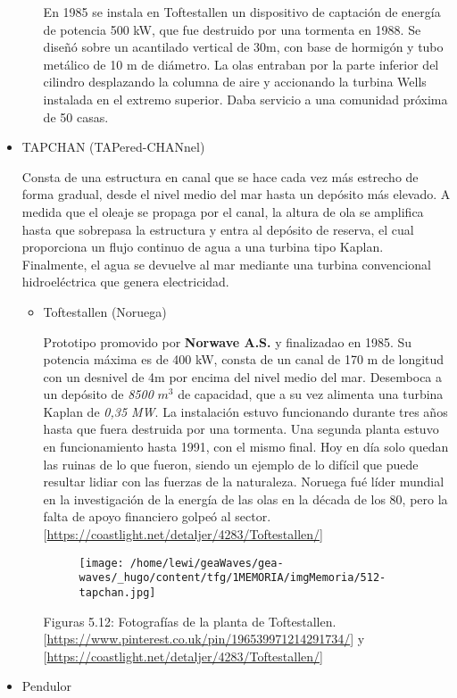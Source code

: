 \begin{itemize}
\begin{itemize}
    En 1985 se instala en Toftestallen un dispositivo de captación de
    energía de potencia 500 kW, que fue destruido por una tormenta en
    1988. Se diseñó sobre un acantilado vertical de 30m, con base de
    hormigón y tubo metálico de 10 m de diámetro. La olas entraban por
    la parte inferior del cilindro desplazando la columna de aire y
    accionando la turbina Wells instalada en el extremo superior. Daba
    servicio a una comunidad próxima de 50 casas.
  \end{itemize}
\item
  TAPCHAN (TAPered-CHANnel)

  Consta de una estructura en canal que se hace cada vez más estrecho de
  forma gradual, desde el nivel medio del mar hasta un depósito más
  elevado. A medida que el oleaje se propaga por el canal, la altura de
  ola se amplifica hasta que sobrepasa la estructura y entra al depósito
  de reserva, el cual proporciona un flujo continuo de agua a una
  turbina tipo Kaplan. Finalmente, el agua se devuelve al mar mediante
  una turbina convencional hidroeléctrica que genera electricidad.

  \begin{itemize}
  \item
    Toftestallen (Noruega)

    Prototipo promovido por \textbf{Norwave A.S.} y finalizadao en 1985.
    Su potencia máxima es de 400 kW, consta de un canal de 170 m de
    longitud con un desnivel de 4m por encima del nivel medio del mar.
    Desemboca a un depósito de \emph{8500} \(m^3\) de capacidad, que a
    su vez alimenta una turbina Kaplan de \emph{0,35 MW}. La instalación
    estuvo funcionando durante tres años hasta que fuera destruida por
    una tormenta. Una segunda planta estuvo en funcionamiento hasta
    1991, con el mismo final. Hoy en día solo quedan las ruinas de lo
    que fueron, siendo un ejemplo de lo difícil que puede resultar
    lidiar con las fuerzas de la naturaleza. Noruega fué líder mundial
    en la investigación de la energía de las olas en la década de los
    80, pero la falta de apoyo financiero golpeó al sector.
    {[}\url{https://coastlight.net/detaljer/4283/Toftestallen/}{]}

    \begin{figure}
    \centering
    \texttt{[image: /home/lewi/geaWaves/gea-waves/\_hugo/content/tfg/1MEMORIA/imgMemoria/512-tapchan.jpg]}
    \caption{}
    \end{figure}

    Figuras 5.12: Fotografías de la planta de Toftestallen.
    {[}\url{https://www.pinterest.co.uk/pin/196539971214291734/}{]} y
    {[}\url{https://coastlight.net/detaljer/4283/Toftestallen/}{]}
  \end{itemize}
\item
  Pendulor


\end{itemize}
